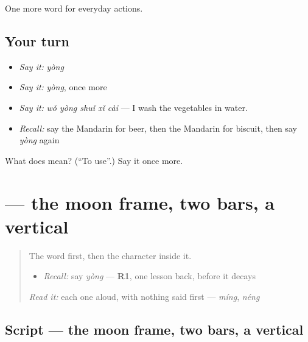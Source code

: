 \begin{grammarlens}[title={What you've built}]
One more word for everyday actions.
\end{grammarlens}

\subsection*{Your turn}
\begin{itemize}
\raggedright
  \item \emph{Say it:} \emph{yòng}
  \item \emph{Say it:} \emph{yòng}, once more
  \item \emph{Say it:} \emph{wǒ yòng shuǐ xǐ cài} — I wash the vegetables in water.
  \item \emph{Recall:} say the Mandarin for beer, then the Mandarin for biscuit, then say \emph{yòng} again
\end{itemize}

\begin{tcolorbox}[breakable,colback=teal!4,colframe=teal!35!black,title={Before you move on}]
What does  mean? (\textquotedblleft{}To use\textquotedblright{}.) Say it once more.
\end{tcolorbox}
\section[\texorpdfstring{\zh{用} (yòng)}{用 (yòng)}]{ — the moon frame, two bars, a vertical}

\label{lesson:ZH-W103-yong}



\begin{quote}
The word first, then the character inside it.

\begin{itemize}
\raggedright
  \item \emph{Recall:} say \emph{yòng} — \textbf{R1}, one lesson back, before it decays
\end{itemize}

\begin{quote}
 
\end{quote}

\emph{Read it:} each one aloud, with nothing said first — \emph{míng}, \emph{néng}
\end{quote}

\subsection*{Script — the moon frame, two bars, a vertical}


